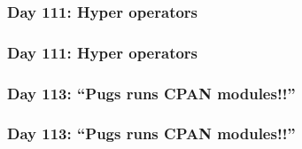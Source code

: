 \documentclass[12pt,compress,english,utf8,t]{beamer}
\newcommand{\inputminted}[2]{}
\begin{document}


\subsubsection{Day 111: Hyper operators}

\begin{frame}[label=hyper-operators]\frametitle{Day 111: Hyper operators}

  \inputminted{perl}{code-snippets/day111-hyper-operators.pl}
\end{frame}


\subsubsection{Day 113: ``Pugs runs CPAN modules!!''}

\begin{frame}[label=pugs-cpan]\frametitle{Day 113: ``Pugs runs CPAN
modules!!''}

  \inputminted{perl}{code-snippets/day113-pugs-cpan.pl}
\end{frame}
\end{document}
